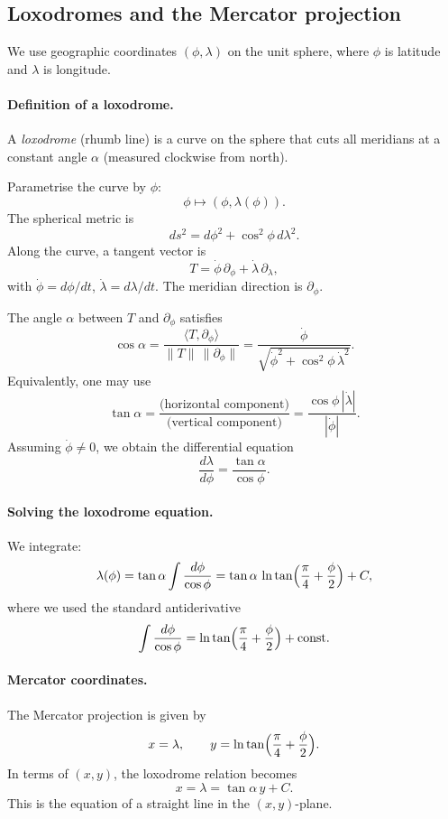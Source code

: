 \documentclass[12pt,a4paper]{article}
\theoremstyle{plain}
\theoremstyle{definition}      %
\begin{document}
\subsection*{Loxodromes and the Mercator projection}

We use geographic coordinates $(\phi,\lambda)$ on the unit sphere,
where $\phi$ is latitude and $\lambda$ is longitude.

\paragraph{Definition of a loxodrome.}
A \emph{loxodrome} (rhumb line) is a curve on the sphere that cuts all
meridians at a constant angle $\alpha$ (measured clockwise from north).

Parametrise the curve by $\phi$:
\[
\phi \mapsto (\phi,\lambda(\phi)).
\]
The spherical metric is
\[
ds^2 = d\phi^2 + \cos^2\phi\,d\lambda^2.
\]
Along the curve, a tangent vector is
\[
T = \dot\phi\,\partial_\phi + \dot\lambda\,\partial_\lambda,
\]
with $\dot\phi = d\phi/dt$, $\dot\lambda = d\lambda/dt$.
The meridian direction is $\partial_\phi$.

The angle $\alpha$ between $T$ and $\partial_\phi$ satisfies
\[
\cos\alpha
= \frac{\langle T,\partial_\phi\rangle}
{\|T\|\,\|\partial_\phi\|}
= \frac{\dot\phi}{\sqrt{\dot\phi^{2} + \cos^2\phi\,\dot\lambda^{2}}}.
\]
Equivalently, one may use
\[
\tan\alpha
= \frac{\text{(horizontal component)}}{\text{(vertical component)}}
= \frac{\cos\phi\,|\dot\lambda|}{|\dot\phi|}.
\]
Assuming $\dot\phi\neq 0$, we obtain the differential equation
\[
\frac{d\lambda}{d\phi} = \frac{\tan\alpha}{\cos\phi}.
\]

\paragraph{Solving the loxodrome equation.}
We integrate:
\[
\lambda(\phi)
= \tan\alpha \int \frac{d\phi}{\cos\phi}
= \tan\alpha \,\ln\tan\Bigl(\frac{\pi}{4}+\frac{\phi}{2}\Bigr) + C,
\]
where we used the standard antiderivative
\[
\int \frac{d\phi}{\cos\phi}
= \ln\tan\Bigl(\frac{\pi}{4}+\frac{\phi}{2}\Bigr) + \text{const}.
\]

\paragraph{Mercator coordinates.}
The Mercator projection is given by
\[
x = \lambda,\qquad
y = \ln\tan\Bigl(\frac{\pi}{4}+\frac{\phi}{2}\Bigr).
\]
In terms of $(x,y)$, the loxodrome relation becomes
\[
x = \lambda
= \tan\alpha \,y + C.
\]
This is the equation of a straight line in the $(x,y)$-plane.
\end{document}

